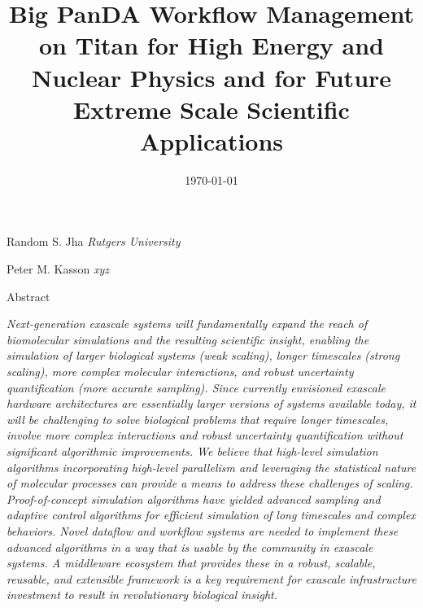 \documentclass[10pt,letterpaper,draft]{article}
\date{\today}
\title{\bf Big PanDA Workflow Management on Titan for High Energy and Nuclear Physics and for Future Extreme Scale Scientific Applications}
\begin{document}




\renewcommand{\thepage}{\arabic{page}}


\thispagestyle{empty}
\begin{center} 

\Large Random
\vspace{0.25in}
\large S. Jha
\large {\it Rutgers University}

\vspace{0.25in}
\large Peter M. Kasson
\large {\it xyz}

\vspace{0.25in}

\large Abstract

\end{center} {\it Next-generation exascale systems will fundamentally expand the reach of biomolecular simulations and the resulting scientific insight, enabling the simulation of larger biological systems (weak scaling), longer timescales (strong scaling), more complex molecular interactions, and robust uncertainty quantification (more accurate sampling).  Since currently envisioned exascale hardware architectures are essentially larger versions of systems available today, it will be challenging to solve biological problems that require longer timescales, involve more complex interactions and robust uncertainty quantification without significant algorithmic improvements.  We believe that high-level simulation algorithms incorporating high-level parallelism and leveraging the statistical nature of molecular processes can provide a means to address these challenges of scaling.  Proof-of-concept simulation algorithms have yielded advanced sampling and adaptive control algorithms for efficient simulation of long timescales and complex behaviors. Novel dataflow and workflow systems are needed to implement these advanced algorithms in a way that is usable by the community in exascale systems. A middleware ecosystem that provides these in a robust, scalable, reusable, and extensible framework is a key requirement for exascale infrastructure investment to result in revolutionary biological insight.  }
\end{document}
